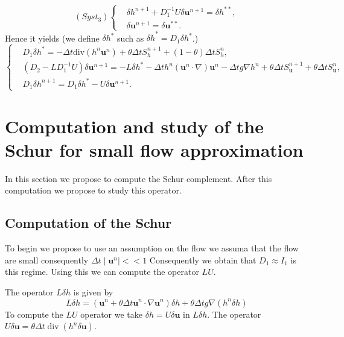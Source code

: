 \documentclass[a4paper, 11pt]{article}
\begin{document}
\begin{equation*}
(Syst_3)\left\{\begin{split}
&\delta h^{n+1}+D_1^{-1}U\delta \boldsymbol{u}^{n+1}=\delta h^{**},\\
&\delta \boldsymbol{u}^{n+1}=\delta \boldsymbol{u}^{**}.
\end{split}\right.
\end{equation*}
Hence it yields (we define $\delta h^*$ such as $\overline{\delta h}^*=D_1\delta h^*$.)
\begin{equation*}
\left\{
\begin{split}
&D_1\delta h^{*}=-\Delta t\text{div}(h^n\boldsymbol{u}^n)+\theta \Delta tS_h^{n+1}+(1-\theta)\Delta t S_{h}^n,\\
&(D_2-LD_1^{-1}U)\delta \boldsymbol{u}^{n+1}=-L\delta h^*-\Delta th^n(\boldsymbol{u}^n\cdot\nabla)\boldsymbol{u}^n-\Delta tg\nabla h^n+\theta\Delta tS_{\boldsymbol{u}}^{n+1}+\theta\Delta tS_{\boldsymbol{u}}^n,\\
&D_1\delta h^{n+1}=D_1\delta h^*-U\delta \boldsymbol{u}^{n+1}.
\end{split}\right.
\end{equation*}


\section{Computation and study of the Schur for small flow approximation}
In this section we propose to compute the Schur complement. After this computation we propose to study this operator.

\subsection{Computation of the Schur}
To begin we propose to use an assumption on the flow we assuma that the flow are small consequently $\Delta t \mid \boldsymbol{u}^n\mid <<1$ Consequently we obtain that $D_1\approx I_1$ is this regime. Using this we can compute the operator $LU$.

The operator $L \delta h$ is given by
$$
L \delta h =(\boldsymbol{u}^n+\theta \Delta t \boldsymbol{u}^n\cdot \nabla \boldsymbol{u}^n )\delta h+\theta \Delta t g \nabla( h^n\delta h)
$$
To compute the $LU$ operator we take $\delta h=U\delta \boldsymbol{u}$ in $L \delta h$. The operator $U\delta \boldsymbol{u}=\theta \Delta t \operatorname{div}(h^n \delta \boldsymbol{u})$.
\end{document}
